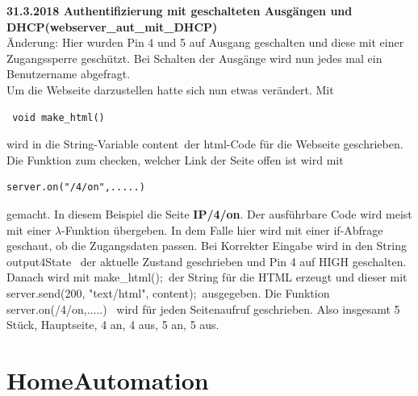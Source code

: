 \documentclass[11pt,fleqn]{book} %
\numberwithin{equation}{section} %
\numberwithin{figure}{section} %
\numberwithin{table}{section} %
\begin{document}
\textbf{\color{red}31.3.2018 Authentifizierung mit geschalteten Ausgängen und DHCP(webserver\_aut\_mit\_DHCP)\color{black}}\\
Änderung: Hier wurden Pin 4 und 5 auf Ausgang geschalten und diese mit einer Zugangssperre geschützt. Bei Schalten der Ausgänge wird nun jedes mal ein Benutzername abgefragt.\\
Um die Webseite darzustellen hatte sich nun etwas verändert. Mit
\begin{lstlisting}
 void make_html()
\end{lstlisting}
wird in die String-Variable \grqq content\grqq \ der html-Code für die Webseite geschrieben. Die Funktion zum checken, welcher Link der Seite offen ist wird mit
\begin{lstlisting}
server.on("/4/on",.....)
\end{lstlisting}
gemacht. In diesem Beispiel die Seite \textbf{IP/4/on}. Der ausführbare Code wird meist mit einer $\lambda$-Funktion übergeben. In dem Falle hier wird mit einer if-Abfrage geschaut, ob die Zugangsdaten passen. Bei Korrekter Eingabe wird in den String \grqq output4State \grqq \ der aktuelle Zustand geschrieben und Pin 4 auf HIGH geschalten. Danach wird mit \grqq make\_html();\grqq \ der String für die HTML erzeugt und dieser mit \grqq server.send(200, "text/html", content);\grqq \ ausgegeben. Die Funktion \grqq server.on(\glqq /4/on\grqq,.....) \grqq \ wird für jeden Seitenaufruf geschrieben. Also insgesamt 5 Stück, Hauptseite, 4 an, 4 aus, 5 an, 5 aus.



\chapter{HomeAutomation}
\end{document}
